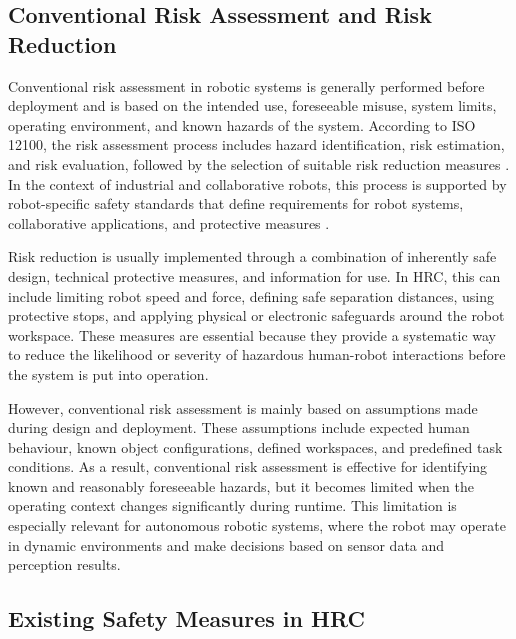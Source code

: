 \subsection{Conventional Risk Assessment and Risk Reduction}

{\small

Conventional risk assessment in robotic systems is generally performed before deployment and is based on the intended use, foreseeable misuse, system limits, operating environment, and known hazards of the system. According to ISO 12100, the risk assessment process includes hazard identification, risk estimation, and risk evaluation, followed by the selection of suitable risk reduction measures \cite{iso12100}. In the context of industrial and collaborative robots, this process is supported by robot-specific safety standards that define requirements for robot systems, collaborative applications, and protective measures \cite{iso10218_1_2025,iso10218_2_2025,iso15066}.

Risk reduction is usually implemented through a combination of inherently safe design, technical protective measures, and information for use. In HRC, this can include limiting robot speed and force, defining safe separation distances, using protective stops, and applying physical or electronic safeguards around the robot workspace. These measures are essential because they provide a systematic way to reduce the likelihood or severity of hazardous human-robot interactions before the system is put into operation.

However, conventional risk assessment is mainly based on assumptions made during design and deployment. These assumptions include expected human behaviour, known object configurations, defined workspaces, and predefined task conditions. As a result, conventional risk assessment is effective for identifying known and reasonably foreseeable hazards, but it becomes limited when the operating context changes significantly during runtime. This limitation is especially relevant for autonomous robotic systems, where the robot may operate in dynamic environments and make decisions based on sensor data and perception results.

}
\subsection{Existing Safety Measures in HRC}

